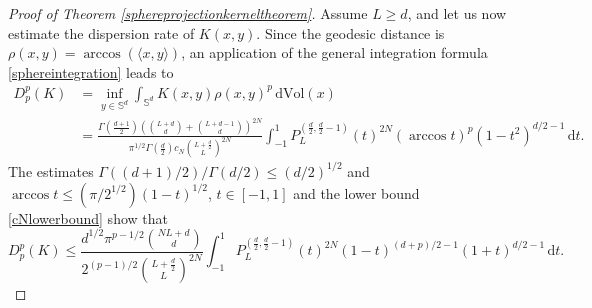 \documentclass[11pt,a4paper]{article}
\theoremstyle{definition}
\begin{document}
\begin{proof}[Proof of Theorem \ref{sphereprojectionkerneltheorem}]
Assume $L \ge d$, and let us now estimate the dispersion rate of $K(x,y)$. Since the geodesic distance is $\rho(x,y)=\arccos (\langle x,y \rangle)$, an application of the general integration formula \eqref{sphereintegration} leads to
\[ \begin{split} D_p^p (K) &= \inf_{y \in \mathbb{S}^d} \int_{\mathbb{S}^d} K(x,y) \rho(x,y)^p \, \mathrm{d}\mathrm{Vol}(x) \\ &= \frac{\Gamma \left( \frac{d+1}{2} \right) \left( \binom{L+d}{d} + \binom{L+d-1}{d}\right)^{2N}}{\pi^{1/2} \Gamma \left( \frac{d}{2} \right) c_N \binom{L+\frac{d}{2}}{L}^{2N}} \int_{-1}^1 P_L^{(\frac{d}{2}, \frac{d}{2}-1)} (t)^{2N} (\arccos t)^p (1-t^2)^{d/2-1} \, \mathrm{d}t . \end{split} \]
The estimates $\Gamma((d+1)/2) / \Gamma(d/2) \le (d/2)^{1/2}$ and $\arccos t \le (\pi/2^{1/2}) (1-t)^{1/2}$, $t \in [-1,1]$ and the lower bound \eqref{cNlowerbound} show that
\begin{equation}\label{Dpsphere}
D_p^p(K) \le \frac{d^{1/2} \pi^{p-1/2} \binom{NL+d}{d}}{2^{(p-1)/2} \binom{L+\frac{d}{2}}{L}^{2N}} \int_{-1}^1 P_L^{(\frac{d}{2}, \frac{d}{2}-1)}(t)^{2N} (1-t)^{(d+p)/2-1}(1+t)^{d/2-1} \, \mathrm{d}t .
\end{equation}


\end{proof}
\end{document}
